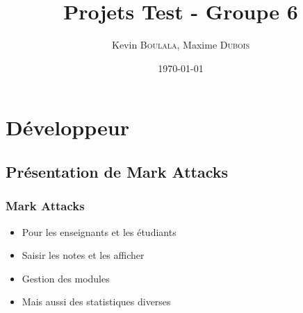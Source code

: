 \documentclass{beamer}
\title{Projets Test - Groupe 6}
\author{Kevin \textsc{Boulala}, Maxime \textsc{Dubois}}
\institute{Université de Franche Comté}
\date{\today}
\begin{document}
  \begin{frame}
    \titlepage
  \end{frame}

  \begin{frame}
    \setcounter{tocdepth}{2}
	  \tableofcontents[]
  \end{frame}
  
  \section{Développeur}
  
    \begin{frame}
    	\tableofcontents[currentsection]
    \end{frame}
  
    \subsection{Présentation de Mark Attacks}
    \begin{frame}
      \frametitle{Mark Attacks}
      \begin{block}{}
        \begin{itemize}
          \item Pour les enseignants et les étudiants
          \item Saisir les notes et les afficher
          \item Gestion des modules
          \item Mais aussi des statistiques diverses
        \end{itemize}
      \end{block}
    \end{frame}
    
\end{document}
